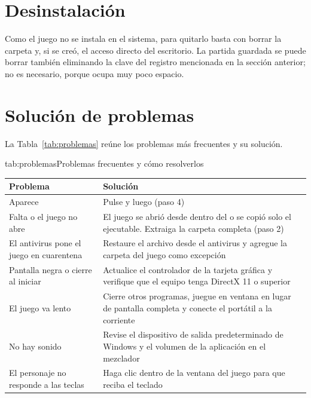 \documentclass[stu,letterpaper,12pt,donotrepeattitle,floatsintext]{apa7}
\begin{document}
\section{Desinstalación}

Como el juego no se instala en el sistema, para quitarlo basta con borrar la carpeta
 y, si se creó, el acceso directo del escritorio. La partida guardada se puede
borrar también eliminando la clave del registro mencionada en la sección anterior; no es necesario,
porque ocupa muy poco espacio.

\section{Solución de problemas}

La Tabla~\ref{tab:problemas} reúne los problemas más frecuentes y su solución.

\begin{TablaAPA}{tab:problemas}{Problemas frecuentes y cómo resolverlos}
\begin{tabularx}{\linewidth}{P{5cm}L}
\toprule
Problema & Solución \\
\midrule
Aparece  & Pulse  y luego  (paso 4) \\
Falta  o el juego no abre & El juego se abrió desde dentro del  o se copió solo el ejecutable. Extraiga la carpeta completa (paso 2) \\
El antivirus pone el juego en cuarentena & Restaure el archivo desde el antivirus y agregue la carpeta del juego como excepción \\
Pantalla negra o cierre al iniciar & Actualice el controlador de la tarjeta gráfica y verifique que el equipo tenga DirectX 11 o superior \\
El juego va lento & Cierre otros programas, juegue en ventana en lugar de pantalla completa y conecte el portátil a la corriente \\
No hay sonido & Revise el dispositivo de salida predeterminado de Windows y el volumen de la aplicación en el mezclador \\
El personaje no responde a las teclas & Haga clic dentro de la ventana del juego para que reciba el teclado \\
\bottomrule
\end{tabularx}
\end{TablaAPA}

\printbibliography
\end{document}
